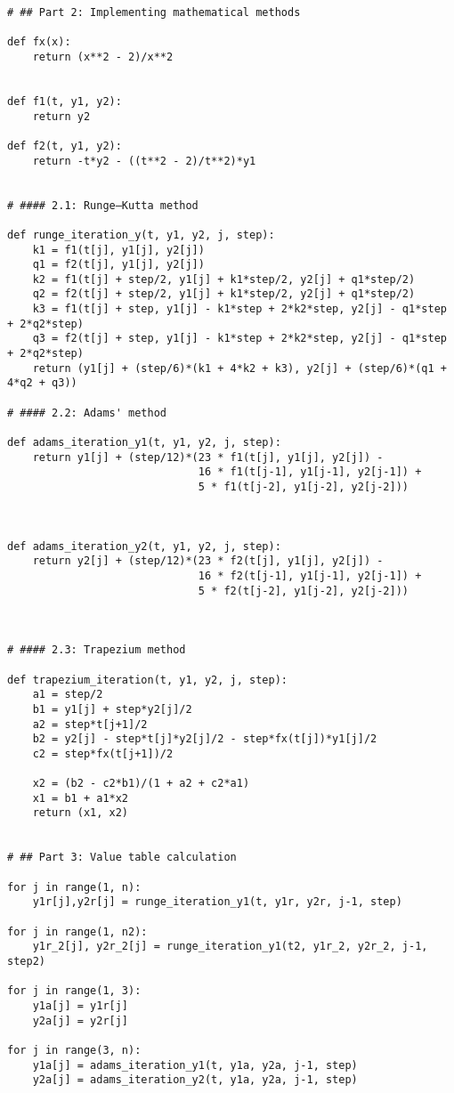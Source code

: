 \documentclass{article}%
\begin{document}
\begin{enumerate}
\begin{verbatim}
# ## Part 2: Implementing mathematical methods

def fx(x):
    return (x**2 - 2)/x**2


def f1(t, y1, y2):
    return y2

def f2(t, y1, y2):
    return -t*y2 - ((t**2 - 2)/t**2)*y1


# #### 2.1: Runge–Kutta method

def runge_iteration_y(t, y1, y2, j, step):
    k1 = f1(t[j], y1[j], y2[j])
    q1 = f2(t[j], y1[j], y2[j])
    k2 = f1(t[j] + step/2, y1[j] + k1*step/2, y2[j] + q1*step/2)
    q2 = f2(t[j] + step/2, y1[j] + k1*step/2, y2[j] + q1*step/2)
    k3 = f1(t[j] + step, y1[j] - k1*step + 2*k2*step, y2[j] - q1*step + 2*q2*step)
    q3 = f2(t[j] + step, y1[j] - k1*step + 2*k2*step, y2[j] - q1*step + 2*q2*step)
    return (y1[j] + (step/6)*(k1 + 4*k2 + k3), y2[j] + (step/6)*(q1 + 4*q2 + q3))

# #### 2.2: Adams' method

def adams_iteration_y1(t, y1, y2, j, step):
    return y1[j] + (step/12)*(23 * f1(t[j], y1[j], y2[j]) - 
                              16 * f1(t[j-1], y1[j-1], y2[j-1]) + 
                              5 * f1(t[j-2], y1[j-2], y2[j-2]))



def adams_iteration_y2(t, y1, y2, j, step):
    return y2[j] + (step/12)*(23 * f2(t[j], y1[j], y2[j]) - 
                              16 * f2(t[j-1], y1[j-1], y2[j-1]) + 
                              5 * f2(t[j-2], y1[j-2], y2[j-2]))


							  
# #### 2.3: Trapezium method

def trapezium_iteration(t, y1, y2, j, step):
    a1 = step/2
    b1 = y1[j] + step*y2[j]/2
    a2 = step*t[j+1]/2
    b2 = y2[j] - step*t[j]*y2[j]/2 - step*fx(t[j])*y1[j]/2
    c2 = step*fx(t[j+1])/2
    
    x2 = (b2 - c2*b1)/(1 + a2 + c2*a1)
    x1 = b1 + a1*x2
    return (x1, x2)


# ## Part 3: Value table calculation 

for j in range(1, n):
    y1r[j],y2r[j] = runge_iteration_y1(t, y1r, y2r, j-1, step)
    
for j in range(1, n2):
    y1r_2[j], y2r_2[j] = runge_iteration_y1(t2, y1r_2, y2r_2, j-1, step2)

for j in range(1, 3):
    y1a[j] = y1r[j]
    y2a[j] = y2r[j]

for j in range(3, n):
    y1a[j] = adams_iteration_y1(t, y1a, y2a, j-1, step)
    y2a[j] = adams_iteration_y2(t, y1a, y2a, j-1, step)


\end{verbatim}
\end{enumerate}
\end{document}
